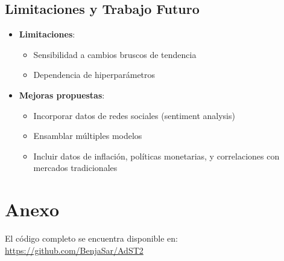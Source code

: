 \documentclass[12pt]{article}
\begin{document}
\subsection{Limitaciones y Trabajo Futuro}

\begin{itemize}
\item \textbf{Limitaciones}:
\begin{itemize}
\item Sensibilidad a cambios bruscos de tendencia
\item Dependencia de hiperparámetros
\end{itemize}

\item \textbf{Mejoras propuestas}:
\begin{itemize}
\item Incorporar datos de redes sociales (sentiment analysis)
\item Ensamblar múltiples modelos
\item Incluir datos de inflación, políticas monetarias, y correlaciones con mercados tradicionales
\end{itemize}
\end{itemize}


\newpage
\section*{Anexo}
El código completo se encuentra disponible en: \\
\url{https://github.com/BenjaSar/AdST2}
\end{document}
